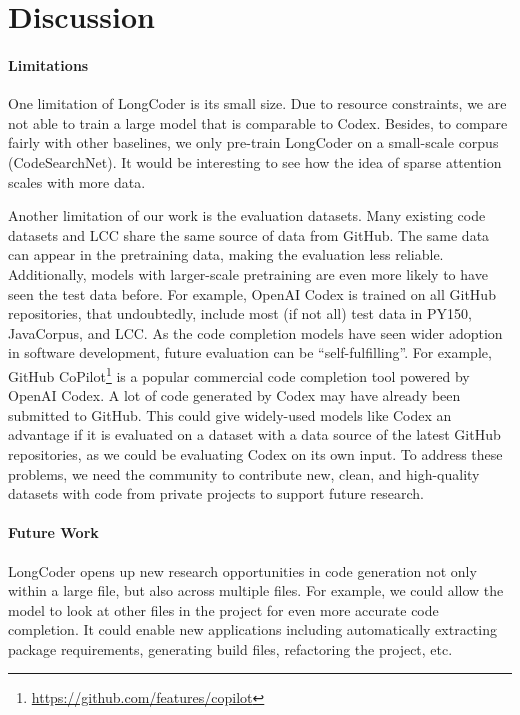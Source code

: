 \documentclass{article}
\begin{document}
\section{Discussion}
\paragraph{Limitations} One limitation of LongCoder is its small size. Due to resource constraints, we are not able to train a large model that is comparable to Codex. Besides, to compare fairly with other baselines, we only pre-train LongCoder on a small-scale corpus (CodeSearchNet). It would be interesting to see how the idea of sparse attention scales with more data.

Another limitation of our work is the evaluation datasets. Many existing code datasets and LCC share the same source of data from GitHub. The same data can appear in the pretraining data, making the evaluation less reliable. Additionally, models with larger-scale pretraining are even more likely to have seen the test data before. For example, OpenAI Codex is trained on all GitHub repositories, that undoubtedly, include most (if not all) test data in PY150, JavaCorpus, and LCC. As the code completion models have seen wider adoption in software development,  future evaluation can be ``self-fulfilling''. For example, GitHub CoPilot\footnote{\url{https://github.com/features/copilot}} is a popular commercial code completion tool powered by OpenAI Codex. A lot of code generated by Codex may have already been submitted to GitHub. This could give widely-used models like Codex an advantage if it is evaluated on a dataset with a data source of the latest GitHub repositories, as we could be evaluating Codex on its own input. To address these problems, we need the community to contribute new, clean, and high-quality datasets with code from private projects to support future research.

\paragraph{Future Work} LongCoder opens up new research opportunities in code generation not only within a large file, but also across multiple files. For example, we could allow the model to look at other files in the project for even more accurate code completion. It could enable new applications including automatically extracting package requirements, generating build files, refactoring the project, etc. 
\end{document}
